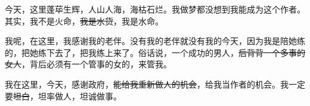 \documentclass{HDU-Bachelor-Thesis}
\begin{document}
今天，这里蓬荜生辉，人山人海，海枯石烂。我做梦都没想到我能成为这个作者。其实，我不是火命，\sout{我是水货}，我是水命。

我呢，在这里，我感谢我的老伴。没有我的老伴就没有我的今天，因为我是陪她练的，把她练下去了，把我练上来了。俗话说，一个成功的男人，\sout{后背背一个多事的女人}，背后必须有一个管事的女的，来管我。

我在这里，今天，感谢政府，\sout{能给我重新做人的机会}，给我当作者的机会。我一定要\sout{坦白}，坦率做人，坦诚做事。

\clearpage
\printbibliography[heading=bibintoc]

\clearpage
{}
\end{document}
